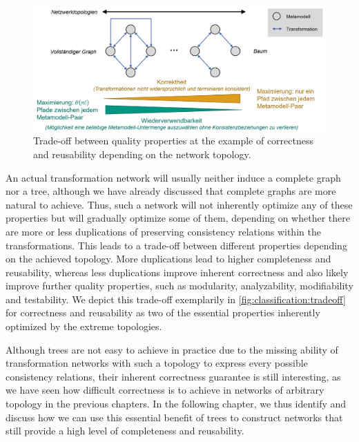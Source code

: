 \begin{figure}
    \centering
    \includegraphics[width=\textwidth]{figures/quality/classification/tradeoff.png}
    \caption[Trade-off between correctness and reusability]{Trade-off between quality properties at the example of correctness and reusability depending on the network topology.}
    \label{fig:classification:tradeoff}
\end{figure}

An actual transformation network will usually neither induce a complete graph nor a tree, although we have already discussed that complete graphs are more natural to achieve.
Thus, such a network will not inherently optimize any of these properties but will gradually optimize some of them, depending on whether there are more or less duplications of preserving consistency relations within the transformations.
This leads to a trade-off between different properties depending on the achieved topology.
More duplications lead to higher completeness and reusability, whereas less duplications improve inherent correctness and also likely improve further quality properties, such as modularity, analyzability, modifiability and testability.
We depict this trade-off exemplarily in \autoref{fig:classification:tradeoff} for correctness and reusability as two of the essential properties inherently optimized by the extreme topologies.

Although trees are not easy to achieve in practice due to the missing ability of transformation networks with such a topology to express every possible consistency relations, their inherent correctness guarantee is still interesting, as we have seen how difficult correctness is to achieve in networks of arbitrary topology in the previous chapters.
In the following chapter, we thus identify and discuss how we can use this essential benefit of trees to construct networks that still provide a high level of completeness and reusability.

